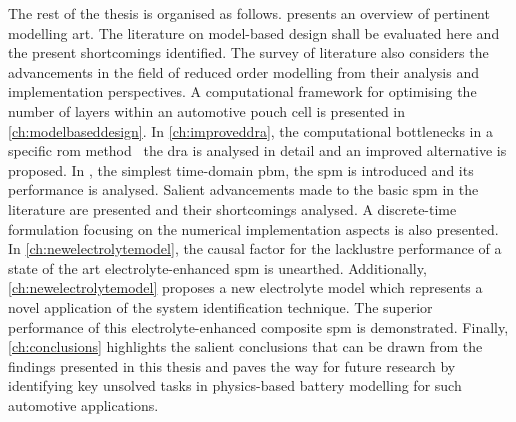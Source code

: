 The rest of the thesis is organised as follows.  presents an
overview of pertinent modelling art.  The literature on model-based design shall
be  evaluated  here and  the  present  shortcomings  identified. The  survey  of
literature  also  considers the  advancements  in  the  field of  reduced  order
modelling from  their analysis and implementation  perspectives. A computational
framework  for  optimising the  number  of  layers  within an  automotive  pouch
cell  is  presented  in  \cref{ch:modelbaseddesign}.  In  \cref{ch:improveddra},
the  computational   bottlenecks  in   a  specific  \gls{rom}   method  \viz~the
\gls{dra} is  analysed in  detail and  an improved  alternative is  proposed. In
,  the simplest  time-domain  \gls{pbm},  the \gls{spm}  is
introduced  and  its  performance  is analysed.  Salient  advancements  made  to
the  basic \gls{spm}  in the  literature  are presented  and their  shortcomings
analysed. A  discrete-time formulation focusing on  the numerical implementation
aspects is  also presented. In \cref{ch:newelectrolytemodel},  the causal factor
for  the lacklustre  performance  of  a state  of  the art  electrolyte-enhanced
\gls{spm} is  unearthed. Additionally, \cref{ch:newelectrolytemodel}  proposes a
new  electrolyte  model which  represents  a  novel  application of  the  system
identification technique. The superior  performance of this electrolyte-enhanced
composite \gls{spm}  is demonstrated. Finally,  \cref{ch:conclusions} highlights
the salient  conclusions that can be  drawn from the findings  presented in this
thesis and paves  the way for future research by  identifying key unsolved tasks
in physics-based battery modelling for such automotive applications.





